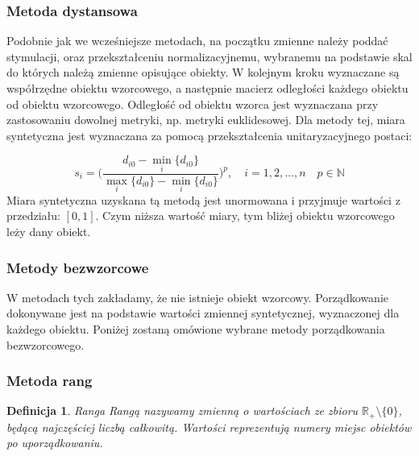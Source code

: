 \documentclass[12pt,a4paper]{report}
\newtheorem{definition}[theorem]{Definicja}
\begin{document}
\subsubsection{Metoda dystansowa}


Podobnie jak we wcześniejsze metodach, na początku zmienne należy poddać stymulacji, oraz przekształceniu normalizacyjnemu, wybranemu na podstawie skal do których należą zmienne opisujące obiekty. W kolejnym kroku wyznaczane są współrzędne obiektu wzorcowego, a następnie macierz odległości każdego obiektu od obiektu wzorcowego. Odległość od obiektu wzorca jest wyznaczana przy zastosowaniu dowolnej metryki, np. metryki euklidesowej. %
Dla metody tej, miara syntetyczna jest wyznaczana za pomocą przekształcenia unitaryzacyjnego postaci: 

$$s_{i}=\bigg(\frac{d_{i0}-\min\limits_{i}\{d_{i0}\}}{\max\limits_{i}\{d_{i0}\}-\min\limits_{i}\{d_{i0}\}} \bigg)^{p}, \quad i=1,2,\dots,n \quad p \in \mathbb{N}
$$
Miara syntetyczna uzyskana tą metodą jest unormowana i przyjmuje wartości z przedziału: $[0,1]$. Czym niższa wartość miary, tym bliżej obiektu wzorcowego leży dany obiekt. 
\subsubsection{Metody bezwzorcowe}


W metodach tych zakładamy, że nie istnieje obiekt wzorcowy. %
Porządkowanie dokonywane jest na podstawie wartości zmiennej syntetycznej, wyznaczonej dla każdego obiektu. 
Poniżej zostaną omówione wybrane metody porządkowania bezwzorcowego.

\subsubsection{Metoda rang}

\begin{definition}{Ranga \cite[Rozdział 1.5]{panek2013}}
Rangą nazywamy zmienną o wartościach ze zbioru ${\mathbb{R}_{+}\setminus{\{0\}}}$, będącą najczęściej liczbą całkowitą. Wartości reprezentują numery miejsc obiektów po uporządkowaniu.
\end{definition}
\end{document}

